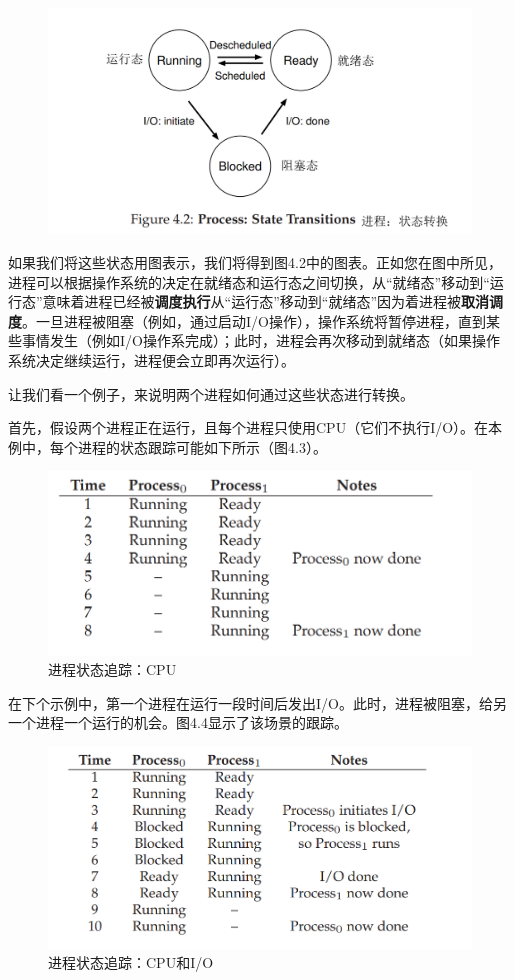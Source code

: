 \begin{figure}[h]
\centering
\includegraphics[height=0.5\textwidth]{fig/figure-4-2.png}
\end{figure}   
如果我们将这些状态用图表示，我们将得到图4.2中的图表。正如您在图中所见，进程可以根据操作系统的决定在就绪态和运行态之间切换，从“就绪态”移动到“运行态”意味着进程已经被\textbf{调度执行}从“运行态”移动到“就绪态”因为着进程被\textbf{取消调度}。一旦进程被阻塞（例如，通过启动I/O操作），操作系统将暂停进程，直到某些事情发生（例如I/O操作系完成）；此时，进程会再次移动到就绪态（如果操作系统决定继续运行，进程便会立即再次运行）。

让我们看一个例子，来说明两个进程如何通过这些状态进行转换。

首先，假设两个进程正在运行，且每个进程只使用CPU（它们不执行I/O）。在本例中，每个进程的状态跟踪可能如下所示（图4.3）。
\clearpage
\begin{figure}[h]
\centering
\includegraphics[height=0.3\textwidth]{fig/figure-4-3.png}
\caption{进程状态追踪：CPU} \label{fig:figure-4-3}
\end{figure}
在下个示例中，第一个进程在运行一段时间后发出I/O。此时，进程被阻塞，给另一个进程一个运行的机会。图4.4显示了该场景的跟踪。
\begin{figure}[h]
\centering
\includegraphics[height=0.3\textwidth]{fig/figure-4-4.png}
\caption{进程状态追踪：CPU和I/O} \label{fig:figure-4-4}
\end{figure}
	
